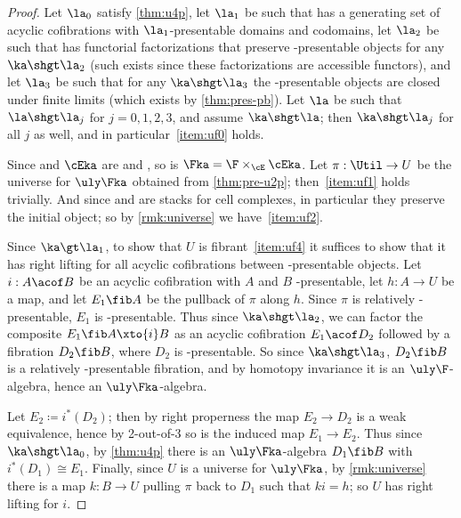 \begin{proof}
  Let $\la_0$ satisfy \cref{thm:u4p}, let $\la_1$ be such that \E has a generating set of acyclic cofibrations with $\la_1$-presentable domains and codomains, let $\la_2$ be such that \E has functorial factorizations that preserve \ka-presentable objects for any $\ka\shgt\la_2$ (such exists since these factorizations are accessible functors), and let $\la_3$ be such that for any $\ka\shgt\la_3$ the \ka-presentable objects are closed under finite limits (which exists by \cref{thm:pres-pb}).
  Let $\la$ be such that $\la\shgt \la_j$ for $j=0,1,2,3$, and assume $\ka\shgt \la$; then $\ka\shgt\la_j$ for all $j$ as well, and in particular~\ref{item:uf0} holds.

  Since \F and $\cEka$ are \local and \stratified, so is $\Fka = {\F\times_\cE \cEka}$.
  Let $\pi:\Util\to U$ be the universe for $\uly\Fka$ obtained from \cref{thm:pre-u2p}; then~\ref{item:uf1} holds trivially.
  And since \cE and \F are stacks for cell complexes, in particular they preserve the initial object; so by \cref{rmk:universe} we have~\ref{item:uf2}.

  Since $\ka\gt\la_1$, to show that $U$ is fibrant~\ref{item:uf4} it suffices to show that it has right lifting for all acyclic cofibrations between \ka-presentable objects.
  Let $i:A\acof B$ be an acyclic cofibration with $A$ and $B$ \ka-presentable, let $h:A\to U$ be a map, and let $E_1 \fib A$ be the pullback of $\pi$ along $h$.
  Since $\pi$ is relatively \ka-presentable, $E_1$ is \ka-presentable.
  Thus since $\ka\shgt\la_2$, we can factor the composite $E_1\fib A \xto{i} B$ as an acyclic cofibration $E_1 \acof D_2$ followed by a fibration $D_2 \fib B$, where $D_2$ is \ka-presentable.
  So since $\ka\shgt\la_3$, $D_2\fib B$ is a relatively \ka-presentable fibration, and by homotopy invariance it is an $\uly\F$-algebra, hence an $\uly\Fka$-algebra.

  Let $E_2\coloneqq i^*(D_2)$; then by right properness the map $E_2 \to D_2$ is a weak equivalence, hence by 2-out-of-3 so is the induced map $E_1 \to E_2$.
  Thus since $\ka\shgt\la_0$, by \cref{thm:u4p} there is an $\uly\Fka$-algebra $D_1 \fib B$ with $i^*(D_1)\cong E_1$.
  Finally, since $U$ is a universe for $\uly\Fka$, by \cref{rmk:universe} there is a map $k:B\to U$ pulling $\pi$ back to $D_1$ such that $k i = h$; so $U$ has right lifting for $i$.


\end{proof}
